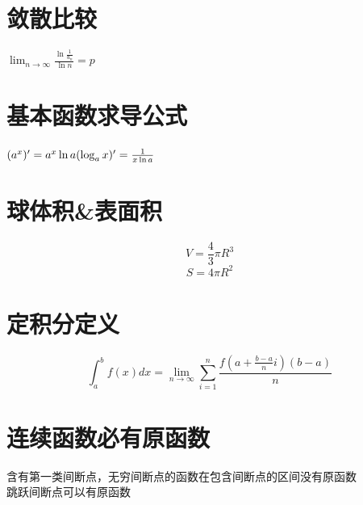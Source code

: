 \documentclass[UTF8]{ctexart}
\begin{document}
\section{敛散比较}
$\lim_{n \rightarrow \infty} \frac{\ln\frac{1}{u_n}}{\ln n }=p$
\section{基本函数求导公式}
$ (a^x)'=a^x \ln a \\
  ( \log _a x)'=\frac{1}{x \ln a} $

\section{球体积\&表面积}
$$ V=\frac{4}{3} \pi R^3$$
$$ S= 4 \pi R^2$$

\section{定积分定义}
$$ \int_a^b f(x)dx= \lim_{n \rightarrow \infty } \sum_{i=1}^n \frac{f \left( a+ \frac{b-a}{n}i \right)(b-a)}{n}$$
\section{连续函数必有原函数}
含有第一类间断点，无穷间断点的函数在包含间断点的区间没有原函数   \\
跳跃间断点可以有原函数 \\
\end{document}
